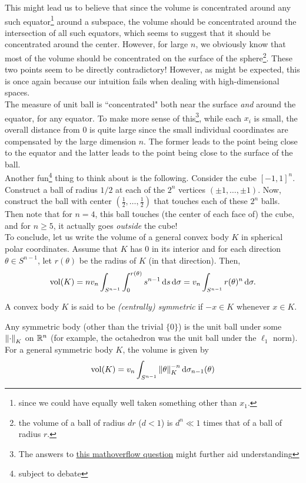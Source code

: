 This might lead us to believe that since the volume is concentrated around any such equator\footnote{since we could have equally well taken something other than $x_1$.} around a subspace, the volume should be concentrated around the intersection of all such equators, which seems to suggest that it should be concentrated around the center. However, for large $n$, we obviously know that most of the volume should be concentrated on the surface of the sphere\footnote{the volume of a ball of radius $dr$ ($d<1$) is $d^n\ll 1$ times that of a ball of radius $r$.}. These two points seem to be directly contradictory! However, as might be expected, this is once again because our intuition fails when dealing with high-dimensional spaces.\\
The measure of unit ball is ``concentrated" both near the surface \textit{and} around the equator, for any equator. To make more sense of this\footnote{The answers to \href{https://mathoverflow.net/questions/210291/how-to-explain-the-concentration-of-measure-phenomenon-intuitively}{this mathoverflow question} might further aid understanding}, while each $x_i$ is small, the overall distance from $0$ is quite large since the small individual coordinates are compensated by the large dimension $n$. The former leads to the point being close to the equator and the latter leads to the point being close to the surface of the ball.\\

Another fun\footnote{subject to debate} thing to think about is the following. Consider the cube $[-1,1]^n$. Construct a ball of radius $1/2$ at each of the $2^n$ vertices $(\pm 1,\ldots, \pm 1)$. Now, construct the ball with center $(\frac{1}{2},\ldots,\frac{1}{2})$ that touches each of these $2^n$ balls. Then note that for $n=4$, this ball touches (the center of each face of) the cube, and for $n\geq 5$, it actually goes \textit{outside} the cube!\\

To conclude, let us write the volume of a general convex body $K$ in spherical polar coordinates. Assume that $K$ has $0$ in its interior and for each direction $\theta\in S^{n-1}$, let $r(\theta)$ be the radius of $K$ (in that direction). Then,
\begin{equation}
\label{eqn: volume in terms of radial distance}
    \operatorname{vol}(K) = nv_n \int_{S^{n-1}}\int_0^{r(\theta)}s^{n-1}\operatorname{d}\!{s}\operatorname{d}\!{\sigma} = v_n\int_{S^{n-1}} r(\theta)^n\operatorname{d}\!{\sigma}.
\end{equation}

\begin{definition}
A convex body $K$ is said to be \textit{(centrally) symmetric} if $-x\in K$ whenever $x\in K$.
\end{definition}
Any symmetric body (other than the trivial $\{0\}$) is the unit ball under some $\left\lVert\cdot\right\rVert_K$ on $\mathbb{R}^n$ (for example, the octahedron was the unit ball under the $\ell_1$ norm). For a general symmetric body $K$, the volume is given by
\begin{equation}
\label{eqn volume in terms of body's norm}
    \operatorname{vol}(K) = v_n\int_{S^{n-1}} \left\lVert\theta\right\rVert_K^{-n} \operatorname{d}\!{\sigma}_{n-1}(\theta)
\end{equation}

